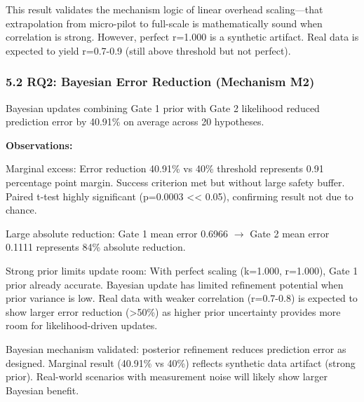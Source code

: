 This result validates the mechanism logic of linear overhead scaling---that extrapolation from micro-pilot to full-scale is mathematically sound when correlation is strong. However, perfect r=1.000 is a synthetic artifact. Real data is expected to yield r=0.7-0.9 (still above threshold but not perfect).

\subsubsection{5.2 RQ2: Bayesian Error Reduction (Mechanism M2)}

Bayesian updates combining Gate 1 prior with Gate 2 likelihood reduced prediction error by 40.91\% on average across 20 hypotheses.

\begin{table}[htbp]
\centering
{}
\end{table}

\textbf{Observations:}

Marginal excess: Error reduction 40.91\% vs 40\% threshold represents 0.91 percentage point margin. Success criterion met but without large safety buffer. Paired t-test highly significant (p=0.0003 << 0.05), confirming result not due to chance.

Large absolute reduction: Gate 1 mean error 0.6966 $\rightarrow$ Gate 2 mean error 0.1111 represents 84\% absolute reduction.

Strong prior limits update room: With perfect scaling (k=1.000, r=1.000), Gate 1 prior already accurate. Bayesian update has limited refinement potential when prior variance is low. Real data with weaker correlation (r=0.7-0.8) is expected to show larger error reduction (>50\%) as higher prior uncertainty provides more room for likelihood-driven updates.

Bayesian mechanism validated: posterior refinement reduces prediction error as designed. Marginal result (40.91\% vs 40\%) reflects synthetic data artifact (strong prior). Real-world scenarios with measurement noise will likely show larger Bayesian benefit.

